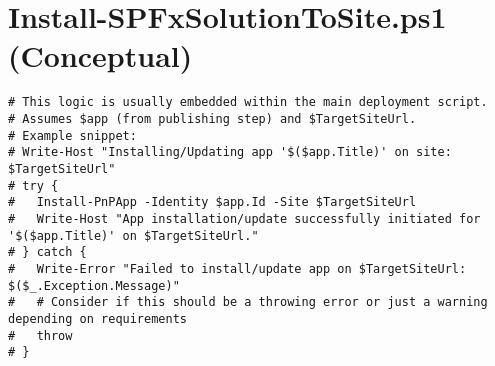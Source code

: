 \section{Install-SPFxSolutionToSite.ps1 (Conceptual)}
\begin{verbatim}
# This logic is usually embedded within the main deployment script.
# Assumes $app (from publishing step) and $TargetSiteUrl.
# Example snippet:
# Write-Host "Installing/Updating app '$($app.Title)' on site: $TargetSiteUrl"
# try {
#   Install-PnPApp -Identity $app.Id -Site $TargetSiteUrl
#   Write-Host "App installation/update successfully initiated for '$($app.Title)' on $TargetSiteUrl."
# } catch {
#   Write-Error "Failed to install/update app on $TargetSiteUrl: $($_.Exception.Message)"
#   # Consider if this should be a throwing error or just a warning depending on requirements
#   throw
# }
\end{verbatim}

